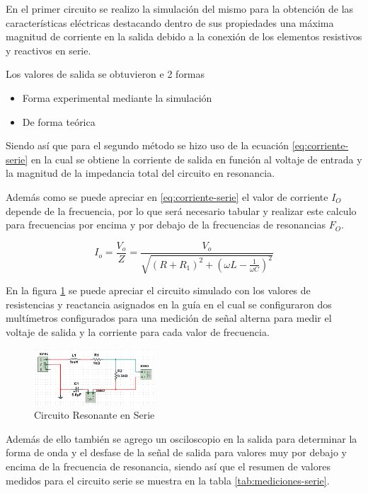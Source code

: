 \documentclass[conference]{IEEEtran}
\begin{document}
	En el primer circuito se realizo la simulación del mismo para la obtención de las características eléctricas destacando dentro de sus propiedades una máxima magnitud de corriente en la salida debido a la conexión de los elementos resistivos y reactivos en serie.
	
	Los valores de salida se obtuvieron e 2 formas
	\begin{itemize}
		\item Forma experimental mediante la simulación 
		\item De forma teórica
	\end{itemize}
	
	Siendo así que para el segundo método se hizo uso de la ecuación \ref{eq:corriente-serie} en la cual se obtiene la corriente de salida en función al voltaje de entrada y la magnitud de la impedancia total del circuito en resonancia.
	
	Además como se puede apreciar en \ref{eq:corriente-serie} el valor de corriente $I_O$ depende de la frecuencia, por lo que será necesario tabular y realizar este calculo para frecuencias por encima y por debajo de la frecuencias de resonancias $F_O$.
	
	\begin{equation}
		I_o = \frac{V_o}{Z} = \frac{V_o}{\sqrt{(R + R_1)^2 + (\omega L - \frac{1}{\omega C})^2}}
		\label{eq:corriente-serie}
	\end{equation}
	
	En la figura \ref{fig:circuito-serie} se puede apreciar el circuito simulado con los valores de resistencias y reactancia asignados en la guía en el cual se configuraron dos multímetros configurados para una medición de señal alterna para medir el voltaje de salida y la corriente para cada valor de frecuencia.
	
	\begin{figure}[h]
		\centering
		\includegraphics[width=0.4\textwidth]{circuito-serie}
		\caption{Circuito Resonante en Serie}
		\label{fig:circuito-serie}
	\end{figure}
	
	Además de ello también se agrego un osciloscopio en la salida para determinar la forma de onda y el desfase de la señal de salida para valores muy por debajo y encima de la frecuencia de resonancia, siendo así que el resumen de valores medidos para el circuito serie se muestra en la tabla \ref{tab:mediciones-serie}.
	
\end{document}
